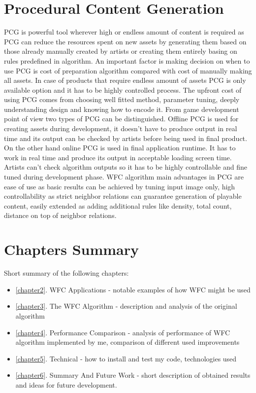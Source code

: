 \documentclass[shortabstract, english, inz]{iithesis}
\begin{document}
\section{Procedural Content Generation}
PCG is powerful tool wherever high or endless amount of content is required as PCG can reduce the resources spent on new assets by generating them based on those already manually created by artists or creating them entirely basing on rules predefined in algorithm. An important factor is making decision on when to use PCG is cost of preparation algorithm compared with cost of manually making all assets. In case of products that require endless amount of assets PCG is only available option and it has to be highly controlled process. The upfront cost of using PCG comes from choosing well fitted method, parameter tuning, deeply understanding design and knowing how to encode it.
From game development point of view two types of PCG can be distinguished. Offline PCG is used for creating assets during development, it doesn't have to produce output in real time and its output can be checked by artists before being used in final product. On the other hand online PCG is used in final application runtime. It has to work in real time and produce its output in acceptable loading screen time. Artists can't check algorithm outputs so it has to be highly controllable and fine tuned during development phase.\cite{DesignLevelConstraints}\break\break
WFC algorithm main advantages in PCG are ease of use as basic results can be achieved by tuning input image only, high controllability as strict neighbor relations can guarantee generation of playable content, easily extended as adding additional rules like density, total count, distance on top of neighbor relations. \cite{Smith, DesignLevelConstraints}

\section{Chapters Summary}
Short summary of the following chapters:
\begin{itemize}
    \item \ref{chapter2}. WFC Applications - notable examples of how WFC might be used
    \item \ref{chapter3}. The WFC Algorithm - description and analysis of the original algorithm
    \item \ref{chapter4}. Performance Comparison - analysis of performance of WFC algorithm implemented by me, comparison of different used improvements
    \item \ref{chapter5}. Technical - how to install and test my code, technologies used
    \item \ref{chapter6}. Summary And Future Work - short description of obtained results and ideas for future development.
\end{itemize}
\end{document}
